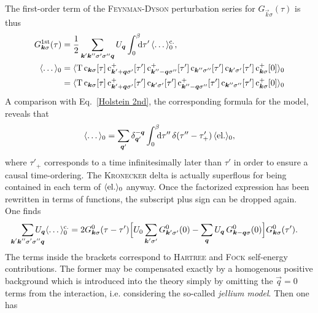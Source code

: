 The first-order term of the \textsc{Feynman-Dyson} perturbation series for
$G_{\vec k \sigma}(\tau)$ is thus
%
\begin{align*}
    G \super{1st}_{\vec k \sigma}(\tau) &= \frac 1 2
    \sum_{\vec k' \vec k'' \sigma' \sigma'' \vec q} U_{\vec q}
    \int \from 0 \till \beta \D \tau' \, \av \dots_0 \super{c.},
    \\
    \av \dots_0 &= \av{\op T \,
        \op c_{\vec k \sigma}[\tau] \,
        \op c_{\vec k' + \vec q \sigma'}^+[\tau'] \,
        \op c_{\vec k'' - \vec q \sigma''}^+[\tau'] \,
        \op c_{\vec k'' \sigma''}[\tau'] \,
        \op c_{\vec k' \sigma'}[\tau'] \,
        \op c_{\vec k \sigma}^+[0]
    }_0 \\ &= \av{\op T \,
        \op c_{\vec k \sigma}[\tau] \,
        \op c_{\vec k' + \vec q \sigma'}^+[\tau'] \,
        \op c_{\vec k' \sigma'}[\tau'] \,
        \op c_{\vec k'' - \vec q \sigma''}^+[\tau'] \,
        \op c_{\vec k'' \sigma''}[\tau'] \,
        \op c_{\vec k \sigma}^+[0]
    }_0
\end{align*}
%
A comparison with Eq.~\ref{Holstein 2nd}, the corresponding formula for the
 model, reveals that
%
\begin{align*}
    \av \dots_0 =
    \sum_{\vec q'} \delta_{\vec q'}^{-\vec q}
    \int \from 0 \till \beta \D \tau'' \,
    \delta(\tau'' - \tau'_+) \, \av{\text{el.}}_0,
\end{align*}
%
where $\tau'_+$ corresponds to a time infinitesimally later than $\tau'$ in
order to ensure a causal time-ordering. The \textsc{Kronecker} delta is actually
superflous for being contained in each term of $\langle\text{el.}\rangle_0$ anyway. Once
the factorized expression has been rewritten in terms of  functions,
the subscript plus sign can be dropped again. One finds
%
\begin{align*}
    \sum_{\mathclap{\vec k' \vec k'' \sigma' \sigma'' \vec q}}
    U_{\vec q} \av \dots_0 \super{c.} =
    2 G^0_{\vec k \sigma}(\tau - \tau')
    \Big[
        U_0 \sum_{\vec k' \sigma'} G^0_{\vec k' \sigma'}(0) -
        \sum_{\vec q} U_{\vec q} \, G^0_{\vec k - \vec q \sigma}(0)
    \Big]
    G^0_{\vec k \sigma}(\tau').
\end{align*}
%
The terms inside the brackets correspond to \textsc{Hartree} and \textsc{Fock}
self-energy contributions. The former may be compensated exactly by a homogenous
positive background which is introduced into the theory simply by omitting the
$\vec q = 0$ terms from the interaction, i.e. considering the so-called
\emph{jellium model}. Then one has
